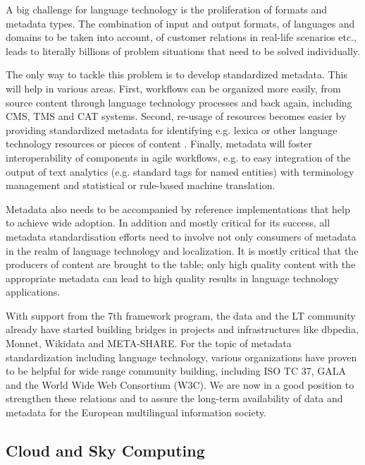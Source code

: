 \documentclass[10pt, plain]{../../metanetpaper}
\begin{document}
\begin{multicols}{2}
A big challenge for language technology is the proliferation of formats and metadata types. The combination of input and output formats, of languages and domains to be taken into account, of customer relations in real-life scenarios etc., leads to literally billions of problem situations that need to be solved individually.

The only way to tackle this problem is to develop standardized metadata. This will help in various areas. First, workflows can be organized more easily, from source content through language technology processes and back again, including CMS, TMS  and CAT systems. Second, re-usage of resources becomes easier by providing standardized metadata for identifying e.g. lexica or other language technology resources or pieces of content . Finally, metadata will foster interoperability of components in agile workflows, e.g. to easy integration of the output of text analytics (e.g. standard tags for named entities) with terminology management and statistical or rule-based machine translation.

Metadata also needs to be accompanied by reference implementations that help to achieve wide adoption. In addition and mostly critical for its success, all metadata standardisation efforts need to involve not only consumers of metadata in the realm of language technology and localization. It is mostly critical that the producers of content are brought to the table; only high quality content with the appropriate metadata can lead to high quality results in language technology applications.

With support from the 7th framework program, the data and the LT community already have started building bridges in projects and infrastructures like dbpedia, Monnet, Wikidata and META-SHARE. For the topic of metadata standardization including language technology, various organizations have proven to be helpful for wide range community building, including ISO TC 37, GALA and the World Wide Web Consortium (W3C). We are now in a good position to strengthen these relations and to assure the long-term availability of data and metadata for the European multilingual information society.

\subsection{Cloud and Sky Computing}
\label{sec:cloud-sky-computing}


\end{multicols}
\end{document}
